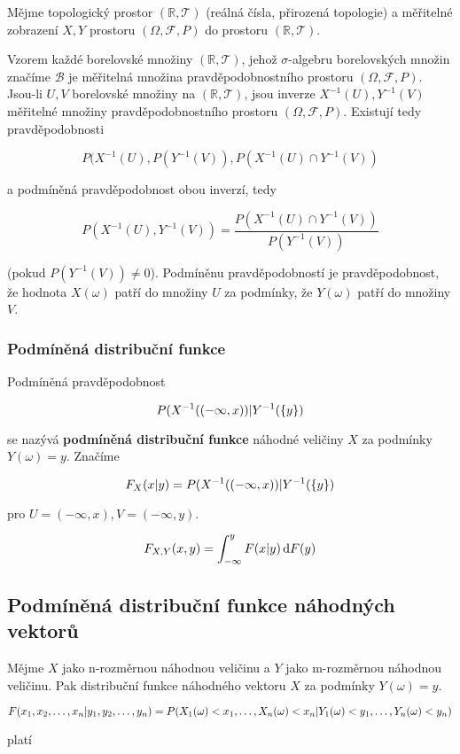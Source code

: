 	Mějme topologický prostor $(\mathbb{R},\mathscr{T})$ (reálná čísla, přirozená topologie) a měřitelné zobrazení $X,Y$ prostoru $(\Omega,\mathscr{F},P)$ do prostoru $(\mathbb{R},\mathscr{T})$.\br

	Vzorem každé borelovské množiny $(\mathbb{R},\mathscr{T})$, jehož $\sigma$-algebru borelovských množin značíme $\mathscr{B}$ je měřitelná množina pravděpodobnostního prostoru $(\Omega,\mathscr{F},P)$. Jsou-li $U,V$ borelovské množiny na $(\mathbb{R},\mathscr{T})$, jsou inverze $X^{-1}(U),Y^{-1}(V)$ měřitelné množiny pravděpodobnostního prostoru $(\Omega,\mathscr{F},P)$. Existují tedy pravděpodobnosti

	\[ P(X^{-1}(U), P(Y^{-1}(V)), P(X^{-1}(U)\cap Y^{-1}(V)) \]

	a podmíněná pravděpodobnost obou inverzí, tedy

	\[ P(X^{-1}(U),Y^{-1}(V)) =\frac{P(X^{-1}(U)\cap Y^{-1}(V))}{P(Y^{-1}(V))}\]

	(pokud $P(Y^{-1}(V))\neq 0$). Podmíněnu pravděpodobností je pravděpodobnost, že hodnota $X(\omega)$ patří do množiny $U$ za podmínky, že $Y(\omega)$ patří do množiny $V$.

	\subsubsection{Podmíněná distribuční funkce}
	Podmíněná pravděpodobnost

	\[ P(X^{-1}((-\infty,x))|Y^{-1}(\brs{y}) \]

	se nazývá \textbf{podmíněná distribuční funkce} náhodné veličiny $X$ za podmínky $Y(\omega)=y$. Značíme

	\[ F_X(x|y)=P(X^{-1}((-\infty,x))|Y^{-1}(\brs{y}) \]

	pro $U=(-\infty,x), V=(-\infty,y)$.

	\[ F_{X,Y}(x,y)=\int_{-\infty}^y F(x|y)\d F(y) \]

	\subsection{Podmíněná distribuční funkce náhodných vektorů}
	Mějme $X$ jako n-rozměrnou náhodnou veličinu a $Y$ jako m-rozměrnou náhodnou veličinu. Pak distribuční funkce náhodného vektoru $X$ za podmínky $Y(\omega)=y$.

	\[ F(\vecrow[x]|\vecrow[y]) = P(X_1(\omega)<x_1,\ldots,X_n(\omega)<x_n | Y_1(\omega)<y_1,\ldots,Y_n(\omega)<y_n) \]

	platí

